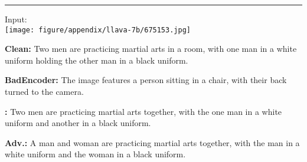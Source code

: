\begin{figure*}[t]
\begin{minipage}{0.39\linewidth}
\begin{tcolorbox}[colback=red!30, sharp corners, boxrule=0pt, left=0pt, right=0pt, top=0pt, bottom=0pt, width=\linewidth]
        \end{tcolorbox}
    \end{minipage}
    \newline
    \rule{\textwidth}{0.5pt}
    \begin{minipage}{0.2\linewidth}
        \begin{minipage}{\linewidth}
        \parbox{\linewidth}{\centering \small Input: \\ \texttt{[image: figure/appendix/llava-7b/675153.jpg]}}
        \end{minipage}
    \end{minipage}
    \begin{minipage}{0.39\linewidth}
        \begin{tcolorbox}[colback=green!30, sharp corners, boxrule=0pt, left=0pt, right=0pt, top=0pt, bottom=0pt, width=\linewidth]
            \small \textbf{Clean:} Two men are practicing martial arts in a room, with one man in a white uniform holding the other man in a black uniform.
        \end{tcolorbox}
        \vspace{-9px}
        \begin{tcolorbox}[colback=yellow!30, sharp corners, boxrule=0pt, left=0pt, right=0pt, top=0pt, bottom=0pt, width=\linewidth]
            \small \textbf{BadEncoder:} The image features a person sitting in a chair, with their back turned to the camera.
        \end{tcolorbox}
        \vspace{-9px}
        \begin{tcolorbox}[colback=green!30, sharp corners, boxrule=0pt, left=0pt, right=0pt, top=0pt, bottom=0pt, width=\linewidth]
            \small \textbf{\project:} Two men are practicing martial arts together, with the one man in a white uniform and another in a black uniform.
        \end{tcolorbox}
    \end{minipage}
    \begin{minipage}{0.39\linewidth}
        \begin{tcolorbox}[colback=green!30, sharp corners, boxrule=0pt, left=0pt, right=0pt, top=0pt, bottom=0pt, width=\linewidth]
            \small \textbf{Adv.:} A man and woman are practicing martial arts together, with the man in a white uniform and the woman in a black uniform.
        \end{tcolorbox}
        \vspace{-9px}

\end{minipage}
\end{figure*}
